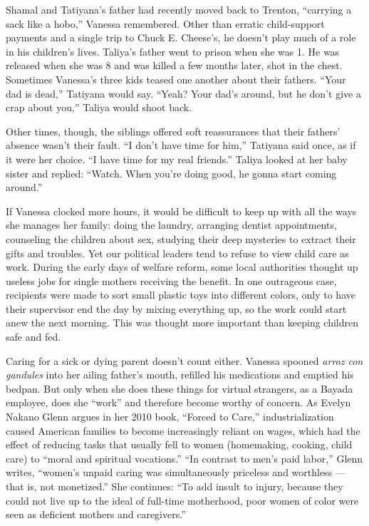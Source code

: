 Shamal and Tatiyana's father had recently moved back to Trenton,
``carrying a sack like a hobo,'' Vanessa remembered. Other than erratic
child-support payments and a single trip to Chuck E. Cheese's, he
doesn't play much of a role in his children's lives. Taliya's father
went to prison when she was 1. He was released when she was 8 and was
killed a few months later, shot in the chest. Sometimes Vanessa's three
kids teased one another about their fathers. ``Your dad is dead,''
Tatiyana would say. ``Yeah? Your dad's around, but he don't give a crap
about you,'' Taliya would shoot back.

Other times, though, the siblings offered soft reassurances that their
fathers' absence wasn't their fault. ``I don't have time for him,''
Tatiyana said once, as if it were her choice. ``I have time for my real
friends.'' Taliya looked at her baby sister and replied: ``Watch. When
you're doing good, he gonna start coming around.''

If Vanessa clocked more hours, it would be difficult to keep up with all
the ways she manages her family: doing the laundry, arranging dentist
appointments, counseling the children about sex, studying their deep
mysteries to extract their gifts and troubles. Yet our political leaders
tend to refuse to view child care as work. During the early days of
welfare reform, some local authorities thought up useless jobs for
single mothers receiving the benefit. In one outrageous case, recipients
were made to sort small plastic toys into different colors, only to have
their supervisor end the day by mixing everything up, so the work could
start anew the next morning. This was thought more important than
keeping children safe and fed.

Caring for a sick or dying parent doesn't count either. Vanessa spooned
\emph{arroz con gandules} into her ailing father's mouth, refilled his
medications and emptied his bedpan. But only when she does these things
for virtual strangers, as a Bayada employee, does she ``work'' and
therefore become worthy of concern. As Evelyn Nakano Glenn argues in her
2010 book, ``Forced to Care,'' industrialization caused American
families to become increasingly reliant on wages, which had the effect
of reducing tasks that usually fell to women (homemaking, cooking, child
care) to ``moral and spiritual vocations.'' ``In contrast to men's paid
labor,'' Glenn writes, ``women's unpaid caring was simultaneously
priceless and worthless --- that is, not monetized.'' She continues:
``To add insult to injury, because they could not live up to the ideal
of full-time motherhood, poor women of color were seen as deficient
mothers and caregivers.''

